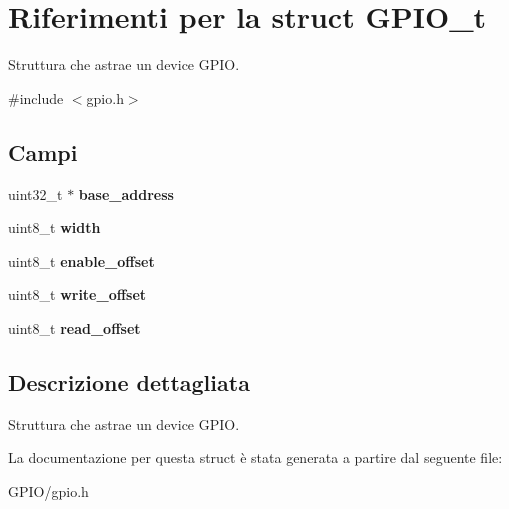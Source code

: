 \hypertarget{struct_g_p_i_o__t}{\section{Riferimenti per la struct G\+P\+I\+O\+\_\+t}
\label{struct_g_p_i_o__t}
}


Struttura che astrae un device G\+P\+I\+O.  




{\ttfamily \#include $<$gpio.\+h$>$}

\subsection*{Campi}
\begin{DoxyCompactItemize}
\item 
\hypertarget{struct_g_p_i_o__t_a79c591d5fa42efdf86abd98347fece90}{uint32\+\_\+t $\ast$ {\bfseries base\+\_\+address}}\label{struct_g_p_i_o__t_a79c591d5fa42efdf86abd98347fece90}

\item 
\hypertarget{struct_g_p_i_o__t_a09a2a45f731b02946ff6d3cd15c1a476}{uint8\+\_\+t {\bfseries width}}\label{struct_g_p_i_o__t_a09a2a45f731b02946ff6d3cd15c1a476}

\item 
\hypertarget{struct_g_p_i_o__t_a14886d03a6936e5edd25a9ad27af16bd}{uint8\+\_\+t {\bfseries enable\+\_\+offset}}\label{struct_g_p_i_o__t_a14886d03a6936e5edd25a9ad27af16bd}

\item 
\hypertarget{struct_g_p_i_o__t_abb65e5db6d4ad365a7c48d00e4af1f78}{uint8\+\_\+t {\bfseries write\+\_\+offset}}\label{struct_g_p_i_o__t_abb65e5db6d4ad365a7c48d00e4af1f78}

\item 
\hypertarget{struct_g_p_i_o__t_ab65acde67dc46f1d163e2ee468420b48}{uint8\+\_\+t {\bfseries read\+\_\+offset}}\label{struct_g_p_i_o__t_ab65acde67dc46f1d163e2ee468420b48}

\end{DoxyCompactItemize}


\subsection{Descrizione dettagliata}
Struttura che astrae un device G\+P\+I\+O. 

La documentazione per questa struct è stata generata a partire dal seguente file\+:\begin{DoxyCompactItemize}
\item 
G\+P\+I\+O/gpio.\+h\end{DoxyCompactItemize}
